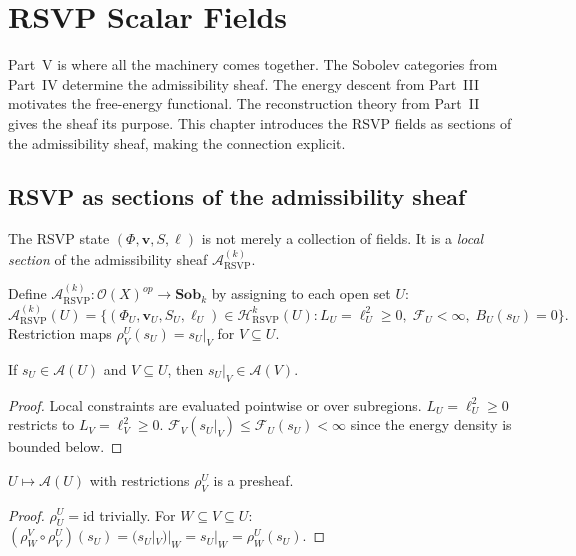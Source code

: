 
\chapter{RSVP Scalar Fields}
\label{ch:rsvp-fields}

\begin{WhyMatters}
  Part~V is where all the machinery comes together.
  The Sobolev categories from Part~IV determine the admissibility
  sheaf.
  The energy descent from Part~III motivates the free-energy
  functional.
  The reconstruction theory from Part~II gives the sheaf its
  purpose.
  This chapter introduces the RSVP fields as sections of the
  admissibility sheaf, making the connection explicit.
\end{WhyMatters}

\section{RSVP as sections of the admissibility sheaf}

The RSVP state $(\Phi, \mathbf{v}, S, \ell)$ is not merely
a collection of fields.
It is a \emph{local section} of the admissibility sheaf
$\mathcal{A}^{(k)}_{\mathrm{RSVP}}$.

\begin{definition}
  \label{def:rsvp-presheaf}
  Define
  $\mathcal{A}^{(k)}_{\mathrm{RSVP}} : \mathcal{O}(X)^{op}
  \to \mathbf{Sob}_k$
  by assigning to each open set $U$:
  \[
    \mathcal{A}^{(k)}_{\mathrm{RSVP}}(U)
    = \{(\Phi_U,\mathbf{v}_U,S_U,\ell_U) \in
      \mathcal{H}^k_{\mathrm{RSVP}}(U) :
      L_U = \ell_U^2 \geq 0,\;
      \mathcal{F}_U < \infty,\;
      B_U(s_U) = 0\}.
  \]
  Restriction maps $\rho^U_V(s_U) = s_U|_V$ for $V \subseteq U$.
\end{definition}

\begin{proposition}
  \label{prop:restrict-adm}
  \statusproven{}
  If $s_U \in \mathcal{A}(U)$ and $V \subseteq U$,
  then $s_U|_V \in \mathcal{A}(V)$.
\end{proposition}

\begin{proof}
  Local constraints are evaluated pointwise or over subregions.
  $L_U = \ell_U^2 \geq 0$ restricts to $L_V = \ell_V^2 \geq 0$.
  $\mathcal{F}_V(s_U|_V) \leq \mathcal{F}_U(s_U) < \infty$
  since the energy density is bounded below.
\end{proof}

\begin{proposition}
  \label{prop:presheaf-functorial}
  \statusproven{}
  $U \mapsto \mathcal{A}(U)$ with restrictions $\rho^U_V$
  is a presheaf.
\end{proposition}

\begin{proof}
  $\rho^U_U = \mathrm{id}$ trivially.
  For $W \subseteq V \subseteq U$:
  $(\rho^V_W \circ \rho^U_V)(s_U)
  = (s_U|_V)|_W = s_U|_W = \rho^U_W(s_U)$.
\end{proof}
